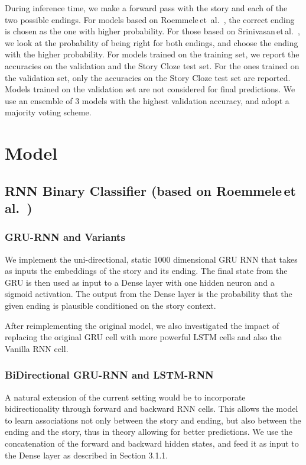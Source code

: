 \documentclass{article}
\begin{document}
During inference time, we make a forward pass with the story and each of the two possible endings. For models based on Roemmele\,et\ al.\ \citep{Roemmele2017AnTest}, the correct ending is chosen as the one with higher probability. For those based on Srinivasan\,et\,al.\ \citep{Srinivasan2018ATest}, we look at the probability of being right for both endings, and choose the ending with the higher probability. For models trained on the training set, we report the accuracies on the validation and the Story Cloze test set. For the  ones trained on the validation set, only the accuracies on the Story Cloze test set are reported. Models trained on the validation set are not considered for final predictions. We use an ensemble of 3 models with the highest validation accuracy, and adopt a majority voting scheme.

\section{Model}
\subsection{RNN Binary Classifier (based on Roemmele\,et\,al.\ \citep{Roemmele2017AnTest})}

\subsubsection{GRU-RNN and Variants}
We implement the uni-directional, static 1000 dimensional GRU RNN that takes as inputs the embeddings of the story and its ending. The final state from the GRU is then used as input to a Dense layer with one hidden neuron and a sigmoid activation. The output from the Dense layer is the probability that the given ending is plausible conditioned on the story context.

After reimplementing the original model, we also investigated the impact of replacing the original GRU cell with more powerful LSTM cells and also the Vanilla RNN cell.

\subsubsection{BiDirectional GRU-RNN and LSTM-RNN}
A natural extension of the current setting would be to incorporate bidirectionality through forward and backward RNN cells. This allows the model to learn associations not only between the story and ending, but also between the ending and the story, thus in theory allowing for better predictions. We use the concatenation of the forward and backward hidden states, and feed it as input to the Dense layer as described in Section 3.1.1.
\end{document}
